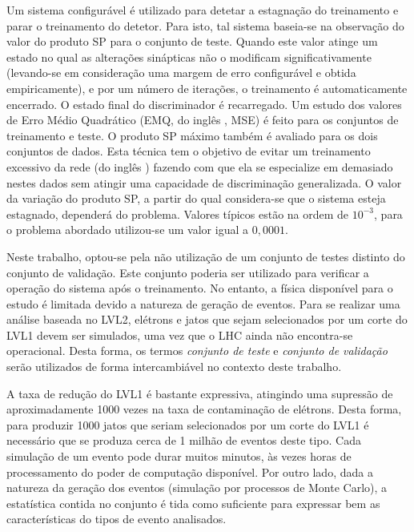 Um sistema configurável é utilizado para detetar a estagnação do treinamento e
parar o treinamento do detetor. Para isto, tal sistema baseia-se na observação
do valor do produto SP para o conjunto de teste. Quando este valor atinge um
estado no qual as alterações sinápticas não o modificam significativamente
(levando-se em consideração uma margem de erro configurável e obtida
empiricamente), e por um número de iterações, o treinamento é automaticamente
encerrado. O estado final do discriminador é recarregado. Um estudo dos
valores de Erro Médio Quadrático (EMQ, do inglês , MSE)
é feito para os conjuntos de treinamento e teste. O produto SP máximo também é
avaliado para os dois conjuntos de dados. Esta técnica tem o objetivo de
evitar um treinamento excessivo da rede (do inglês
) fazendo com que ela se especialize em demasiado nestes
dados sem atingir uma capacidade de discriminação generalizada. O valor da
variação do produto SP, a partir do qual considera-se que o sistema esteja
estagnado, dependerá do problema. Valores típicos estão na ordem de $10^{-3}$,
para o problema abordado utilizou-se um valor igual a $0,0001$.

Neste trabalho, optou-se pela não utilização de um conjunto de testes distinto
do conjunto de validação. Este conjunto poderia ser utilizado para verificar a
operação do sistema após o treinamento. No entanto, a física disponível para o
estudo é limitada devido a natureza de geração de eventos. Para se realizar
uma análise baseada no LVL2, elétrons e jatos que sejam selecionados por um
corte do LVL1 devem ser simulados, uma vez que o LHC ainda não encontra-se
operacional. Desta forma, os termos \textit{conjunto de teste} e
\textit{conjunto de validação} serão utilizados de forma intercambiável no
contexto deste trabalho.

A taxa de redução do LVL1 é bastante expressiva, atingindo uma supressão de
aproximadamente 1000 vezes na taxa de contaminação de elétrons. Desta forma,
para produzir 1000 jatos que seriam selecionados por um corte do LVL1 é
necessário que se produza cerca de 1 milhão de eventos deste tipo. Cada
simulação de um evento pode durar muitos minutos, às vezes horas de
processamento do poder de computação disponível. Por outro lado, dada a
natureza da geração dos eventos (simulação por processos de Monte Carlo), a
estatística contida no conjunto é tida como suficiente para expressar bem as
características do tipos de evento analisados.


